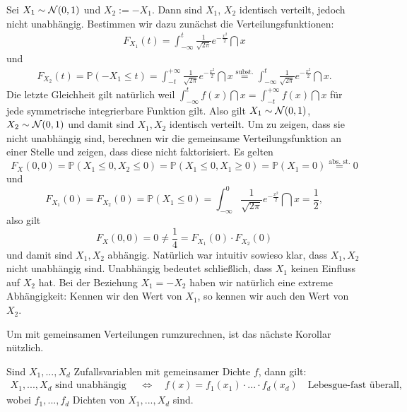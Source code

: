 	\begin{beispiel}	
		 Sei $X_1 \sim \mathcal{N}(0,1)$ und $X_2 := -X_1$. Dann sind $X_1$, $X_2$ identisch verteilt, jedoch nicht unabh\"angig. Bestimmen wir dazu zun\"achst die Verteilungsfunktionen:
		\begin{align*}
			F_{X_1}(t) = \int_{-\infty}^{t} \frac{1}{\sqrt{2 \pi}} e^{-\frac{x^2}{2}} \dint x
		\end{align*}
		und
		\begin{align*}
			F_{X_2}(t) = \mathbb{P}(-X_1 \leq t) = \int_{-t}^{+\infty} \frac{1}{\sqrt{2 \pi}} e^{-\frac{x^2}{2}} \dint x 
			 \overset{\text{subst.}}{=} \int_{-\infty}^{t} \frac{1}{\sqrt{2 \pi}} e^{-\frac{x^2}{2}} \dint x.
		\end{align*}
		Die letzte Gleichheit gilt nat\"urlich weil $\int_{-\infty}^t f(x)\dint x=\int_{-t}^{+\infty} f(x)\dint x$ f\"ur jede symmetrische integrierbare Funktion gilt.
		Also gilt $X_1 \sim \mathcal{N}(0,1)$, $X_2 \sim \mathcal{N}(0,1)$ und damit sind $X_1, X_2$ identisch verteilt. Um zu zeigen, dass sie nicht unabh\"angig sind, berechnen wir die gemeinsame Verteilungsfunktion an einer Stelle und zeigen, dass diese nicht faktorisiert. Es gelten
		\[ F_X(0,0) = \mathbb{P}(X_1 \leq 0, X_2 \leq 0) = \mathbb{P}(X_1 \leq 0, X_1 \geq 0) = \mathbb{P}(X_1 = 0) \overset{\text{abs. st.}}{=} 0 \] und
		\[ F_{X_1}(0) = F_{X_2}(0) = \mathbb{P}(X_1 \leq 0) = \int_{-\infty}^{0} \frac{1}{\sqrt{2 \pi}} e^{-\frac{x^2}{2}} \dint x = \frac{1}{2}, \]
		also gilt $$ F_X(0,0) = 0 \neq \frac{1}{4} = F_{X_1}(0) \cdot F_{X_2}(0)$$ und damit sind $X_1,X_2$ abhängig. Nat\"urlich war intuitiv sowieso klar, dass $X_1, X_2$ nicht unabh\"angig sind. Unabh\"angig bedeutet schlie\ss lich, dass $X_1$ keinen Einfluss auf $X_2$ hat. Bei der Beziehung $X_1=-X_2$ haben wir nat\"urlich eine extreme Abh\"angigkeit: Kennen wir den Wert von $X_1$, so kennen wir auch den Wert von $X_2$.		
\end{beispiel}


Um mit gemeinsamen Verteilungen rumzurechnen, ist das n\"achste Korollar n\"utzlich.
\begin{korollar}\label{unabha}
	Sind $X_1,...,X_d$ Zufallsvariablen mit gemeinsamer Dichte $f$, dann gilt: 
	\begin{align*}	
		X_1,...,X_d\text{ sind unabhängig }\quad \Leftrightarrow \quad f(x) = f_1(x_1)\cdot ... \cdot f_d(x_d)\quad \text{Lebesgue-fast \"uberall},
	\end{align*}	
	wobei $f_1,...,f_d$ Dichten von $X_1,...,X_d$ sind.
\end{korollar}

